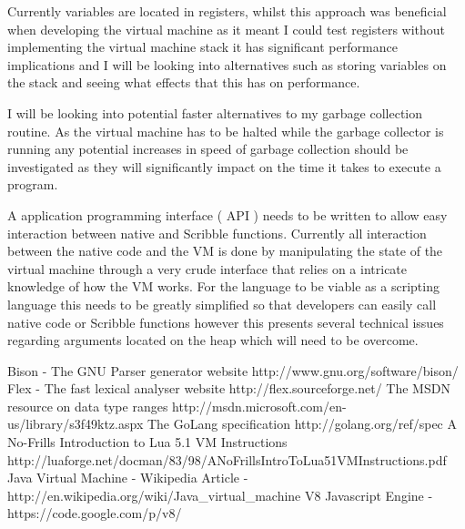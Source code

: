 \documentclass[]{final_report}
\begin{document}
Currently variables are located in registers, whilst this approach was beneficial when developing the virtual machine as it meant I could test registers without implementing the virtual machine stack it has significant performance implications and I will be looking into alternatives such as storing variables on the stack and seeing what effects that this has on performance.

I will be looking into potential faster alternatives to my garbage collection routine. As the virtual machine has to be halted while the garbage collector is running any potential increases in speed of garbage collection should be investigated as they will significantly impact on the time it takes to execute a program.

A application programming interface ( API ) needs to be written to allow easy interaction between native and Scribble functions. Currently all interaction between the native code and the VM is done by manipulating the state of the virtual machine through a very crude interface that relies on a intricate knowledge of how the VM works. For the language to be viable as a scripting language this needs to be greatly simplified so that developers can easily call native code or Scribble functions however this presents several technical issues regarding arguments located on the heap which will need to be overcome.

\newpage
\begin{thebibliography}{99}
 Bison - The GNU Parser generator website http://www.gnu.org/software/bison/
 Flex - The fast lexical analyser website http://flex.sourceforge.net/
 The MSDN resource on data type ranges http://msdn.microsoft.com/en-us/library/s3f49ktz.aspx
 The GoLang specification http://golang.org/ref/spec
 A No-Frills Introduction to Lua 5.1 VM Instructions http://luaforge.net/docman/83/98/ANoFrillsIntroToLua51VMInstructions.pdf‎
 Java Virtual Machine - Wikipedia Article - http://en.wikipedia.org/wiki/Java\_virtual\_machine
 V8 Javascript Engine - https://code.google.com/p/v8/
\end{thebibliography}
\label{endpage}
\end{document}
